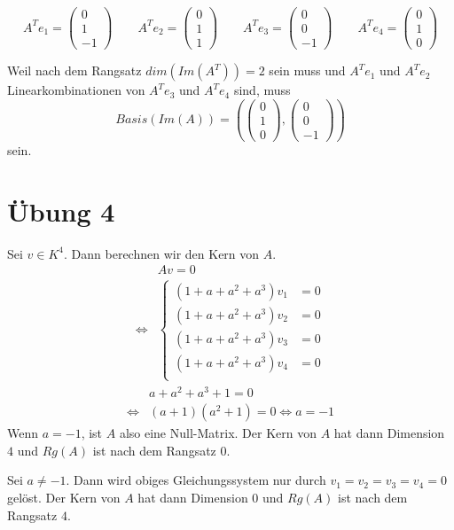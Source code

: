 \documentclass[a4paper,10pt]{article}
\begin{document}
\begin{equation*}
 A^T e_1 =
  \begin{pmatrix}
   0\\
   1\\
   -1
  \end{pmatrix}
 \qquad
 A^T e_2 =
  \begin{pmatrix}
   0\\
   1\\
   1
  \end{pmatrix}
 \qquad
 A^T e_3 =
  \begin{pmatrix}
   0\\
   0\\
   -1
  \end{pmatrix}
 \qquad
 A^T e_4 =
  \begin{pmatrix}
   0\\
   1\\
   0
  \end{pmatrix}
\end{equation*}

Weil nach dem Rangsatz $dim(Im(A^T)) = 2$ sein muss und $A^T e_1$ und $A^T e_2$ Linearkombinationen von $A^T e_3$ und $A^T e_4$ sind, muss
\begin{equation}
 Basis(Im(A)) = \left(
  \begin{pmatrix}
   0\\
   1\\
   0
  \end{pmatrix},
  \begin{pmatrix}
   0\\
   0\\
   -1
  \end{pmatrix}
 \right)
\end{equation}
sein.

\section*{Übung 4}

Sei $v \in K^4$.
Dann berechnen wir den Kern von $A$.
\begin{align*}
 & Av = 0\\
 \Leftrightarrow &
  \begin{cases}
   (1 + a + a^2 + a^3)v_1 & = 0\\
   (1 + a + a^2 + a^3)v_2 & = 0\\
   (1 + a + a^2 + a^3)v_3 & = 0\\
   (1 + a + a^2 + a^3)v_4 & = 0\\
  \end{cases}
\end{align*}
\begin{align*}
 & a + a^2 + a^3 + 1 = 0\\
 \Leftrightarrow & (a + 1)(a^2 + 1) = 0 \Leftrightarrow a = -1
\end{align*}
Wenn $a = -1$, ist $A$ also eine Null-Matrix.
Der Kern von $A$ hat dann Dimension $4$ und $Rg(A)$ ist nach dem Rangsatz $0$.

Sei $a \ne -1$.
Dann wird obiges Gleichungssystem nur durch $v_1 = v_2 = v_3 = v_4 = 0$ gelöst.
Der Kern von $A$ hat dann Dimension $0$ und $Rg(A)$ ist nach dem Rangsatz $4$.
\end{document}
